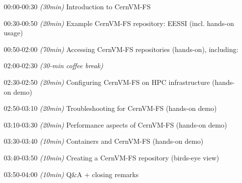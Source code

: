% 
 

\begin{itemize}[style=standard, labelwidth=1.9cm]

    \item [00:00-00:30] \emph{(30min)} Introduction to CernVM-FS
    \item [00:30-00:50] \emph{(20min)} Example CernVM-FS repository: EESSI (incl. hands-on usage)
    \item [00:50-02:00] \emph{(70min)} Accessing CernVM-FS repositories (hands-on), including:

    \item [02:00-02:30] \emph{(30-min coffee break)}

    \item [02:30-02:50] \emph{(20min)} Configuring CernVM-FS on HPC infrastructure (hands-on demo)
    \item [02:50-03:10] \emph{(20min)} Troubleshooting for CernVM-FS (hands-on demo)
    \item [03:10-03:30] \emph{(20min)} Performance aspects of CernVM-FS (hands-on demo)
    \item [03:30-03:40] \emph{(10min)} Containers and CernVM-FS (hands-on demo)
    \item [03:40-03:50] \emph{(10min)} Creating a CernVM-FS repository (birds-eye view)
    \item [03:50-04:00] \emph{(10min)} Q\&A + closing remarks

\end{itemize}

